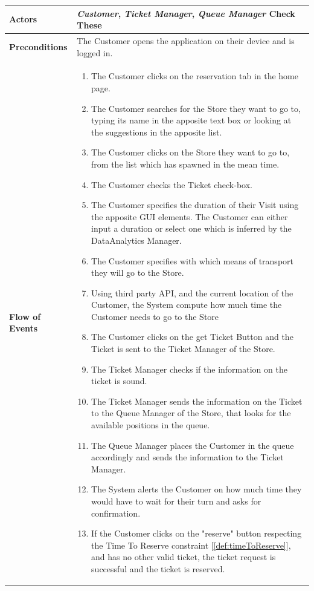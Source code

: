 \documentclass[a4paper, 12pt, oneside]{article}
\newcommand*{\lorenzo}[1]{\textcolor{BurntOrange}{#1}}
\begin{document}
\begin{enumerate}[labelindent=20pt, label={UC.\arabic*}, itemindent=1em,leftmargin=!]
\begin{tabularx}{\linewidth}{| l | X |}

	\hline
	\textbf{Actors} & \textbf{\textit{Customer}}, \textit{\textbf{Ticket Manager}}, \textit{\textbf{Queue Manager}} \lorenzo{Check These}\\
	
	\hline
	\textbf{Preconditions} & The Customer opens the application on their device and is logged in.\\
	
	\hline
	\textbf{Flow of Events} & \parbox{0.7\textwidth}{	
		\begin{enumerate}
		    \item The Customer clicks on the reservation tab in the home page.
			\item The Customer searches for the Store they want to go to, typing its name in the apposite text box or looking at the suggestions in the apposite list.
			\item The Customer clicks on the Store they want to go to, from the list which has spawned in the mean time.
			\item The Customer checks the Ticket check-box.
			\item The Customer specifies the duration of their Visit using the apposite GUI elements. The Customer can either input a duration or select one which is inferred by the DataAnalytics Manager.
			\item The Customer specifies with which means of transport they will go to the Store.
			\item Using third party API, and the current location of the Customer, the System compute how much time the Customer needs to go to the Store
			\item The Customer clicks on the get Ticket Button and the Ticket is sent to the Ticket Manager of the Store.
			\item The Ticket Manager checks if the information on the ticket is sound.
			\item The Ticket Manager sends the information on the Ticket to the Queue Manager of the Store, that looks for the available positions in the queue.
			\item The Queue Manager places the Customer in the queue accordingly and sends the information to the Ticket Manager.
			\item The System alerts the Customer on how much time they would have to wait for their turn and asks for confirmation.
			\item If the Customer clicks on the "reserve" button respecting the Time To Reserve constraint [\ref{def:timeToReserve}], and has no other valid ticket, the ticket request is successful and the ticket is reserved.
	\end{enumerate}}\\
	

\end{tabularx}
\end{enumerate}
\end{document}
